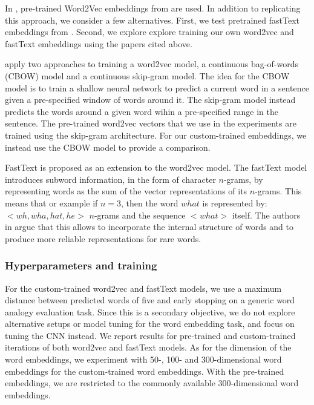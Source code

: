 \documentclass[conference]{IEEEtran}
\begin{document}
In \cite{kim-2014-convolutional}, pre-trained Word2Vec embeddings from \cite{mikolov2013distributed, mikolov2013efficient} are used. In addition to replicating this approach, we consider a few alternatives. First, we test pretrained fastText embeddings from \cite{bojanowski2016enriching, joulin2016bag}. Second, we explore explore training our own word2vec and fastText embeddings using the papers cited above.

 \cite{mikolov2013efficient} apply two approaches to training a word2vec model, a continuous bag-of-words (CBOW) model and a continuous skip-gram model. The idea for the CBOW model  is to train a shallow neural network to predict a current word in a sentence given a pre-specified window of words around it. The skip-gram model instead predicts the words around a given word wihin a pre-specified range in the sentence. The pre-trained word2vec vectors that we use in the experiments are trained using the skip-gram architecture. For our custom-trained embeddings, we instead use the CBOW model to provide a comparison.

FastText \cite{bojanowski2016enriching} is proposed as an extension to the word2vec model. The fastText model introduces subword information, in the form of character $n$-grams, by representing words as the sum of the vector representations of its $n$-grams. This means that or example if $n = 3$, then the word $what$ is represented by: $<wh, wha, hat, he>$ $n$-grams and the sequence $<what>$ itself. The authors in \cite{bojanowski2016enriching} argue that this allows to incorporate the internal structure of words and to produce more reliable representations for rare words.


\subsubsection{Hyperparameters and training}
 For the custom-trained word2vec and fastText models, we use a maximum distance between predicted words of five and early stopping on a generic word analogy evaluation task. Since this is a secondary objective, we do not explore alternative setups or model tuning for the word embedding task, and focus on tuning the CNN instead. We report results for pre-trained and custom-trained iterations of both word2vec and fastText models. As for the dimension of the word embeddings, we experiment with 50-, 100- and 300-dimensional word embeddings for the custom-trained word embeddings. With the pre-trained embeddings, we are restricted to the commonly available 300-dimensional word embeddings. 
\end{document}
